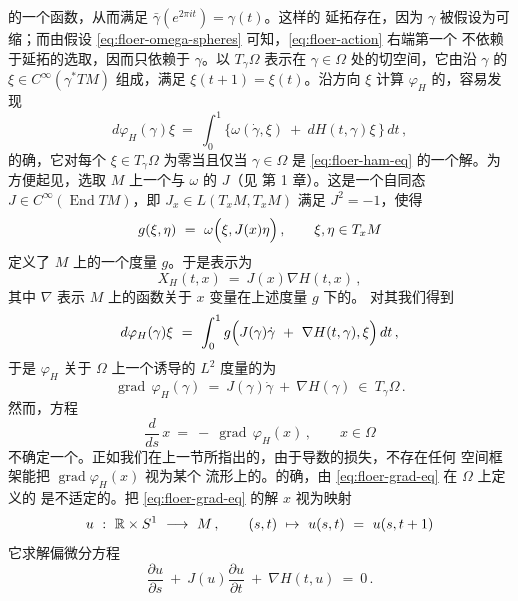的一个\trSmooth{}函数，从而满足 $\bar{\gamma}(e^{2\pi it})=\gamma(t)$。这样的%
延拓存在，因为 $\gamma$ 被假设为可缩；而由假设%
\eqref{eq:floer-omega-spheres} 可知，\eqref{eq:floer-action} 右端第一个%
\trIntegral{}不依赖于延拓的选取，因而只依赖于\trLoop{} $\gamma$。以%
$T_{\gamma}\Omega$ 表示在 $\gamma\in\Omega$ 处的切空间，它由沿 $\gamma$ 的%
\trSmooth{}\trVectorField{} $\xi\in C^{\infty}(\gamma^{*}TM)$ 组成，满足%
$\xi(t+1)=\xi(t)$。沿方向 $\xi$ 计算 $\varphi_{H}$ 的\trDerivative，容易发现
\begin{equation}\label{eq:floer-dphi}
d\varphi_{H}(\gamma)\xi\ =\ \int_{0}^{1}\bigl\{\omega(\dot{\gamma},\xi)\ +\ dH(t,\gamma)\xi\,\bigr\}\,dt\,,
\end{equation}
的确，它对每个 $\xi\in T_{\gamma}\Omega$ 为零当且仅当\trLoop{} $\gamma\in\Omega$%
是\trHamiltonianEquation{} \eqref{eq:floer-ham-eq} 的一个解。为方便起见，选取%
$M$ 上一个与 $\omega$ \trCompatible{}的\trAlmostComplexStructure{} $J$（见%
第 1 章）。这是一个自同态 $J\in C^{\infty}(\operatorname{End}TM)$，即%
$J_{x}\in L(T_{x}M,T_{x}M)$ 满足 $J^{2}=-1$，使得
\begin{equation}\label{eq:floer-metric-g}
g(\xi,\eta)\ =\ \omega\Bigl(\xi,J(x)\eta\Bigr)\,,\qquad \xi,\eta\in T_{x}M
\end{equation}
定义了 $M$ 上的一个\trRiemann{}度量 $g$。于是\trHamiltonianVectorField{}表示为
\begin{equation}\label{eq:floer-XH-Jgrad}
X_{H}(t,x)\ =\ J(x)\nabla H(t,x)\,,
\end{equation}
其中 $\nabla$ 表示 $M$ 上的函数关于 $x$ 变量在上述度量 $g$ 下的\trGradient。%
对其\trDerivative{}我们得到
\begin{equation}\label{eq:floer-dphi-g}
d\varphi_{H}(\gamma)\xi\ =\ \int_{0}^{1}g\Bigl(J(\gamma)\dot{\gamma}\ +\ \nabla H(t,\gamma),\xi\Bigr)\,dt\,,
\end{equation}
于是 $\varphi_{H}$ 关于 $\Omega$ 上一个诱导的 $L^{2}$ 度量的\trGradient{}为
\begin{equation}\label{eq:floer-grad-phi}
\operatorname{grad}\,\varphi_{H}(\gamma)\ =\ J(\gamma)\dot{\gamma}\ +\ \nabla H(\gamma)\ \in\ T_{\gamma}\Omega\,.
\end{equation}
然而，\trGradient{}方程
\begin{equation}\label{eq:floer-grad-eq}
\frac{d}{ds}\,x\ =\ -\ \operatorname{grad}\,\varphi_{H}(x)\,,\qquad x\in\Omega
\end{equation}
不确定一个\trFlow。正如我们在上一节所指出的，由于导数的损失，不存在任何%
\trBanach{}空间框架能把 $\operatorname{grad}\varphi_{H}(x)$ 视为某个\trBanach{}%
流形上的\trVectorField。的确，由 \eqref{eq:floer-grad-eq} 在 $\Omega$ 上定义的%
\trCauchy\trInitialValueProblem{}是不适定的。\trFloer{}把 \eqref{eq:floer-grad-eq}%
的解 $x$ 视为映射
\begin{equation}\label{eq:floer-u-map}
u\ :\ \R\times S^{1}\ \longrightarrow\ M\,,\qquad (s,t)\ \mapsto\ u(s,t)\ =\ u(s,t+1)
\end{equation}
它求解偏微分方程
\begin{equation}\label{eq:floer-pde}
\frac{\partial u}{\partial s}\ +\ J(u)\frac{\partial u}{\partial t}\ +\ \nabla H(t,u)\ =\ 0\,.
\end{equation}

